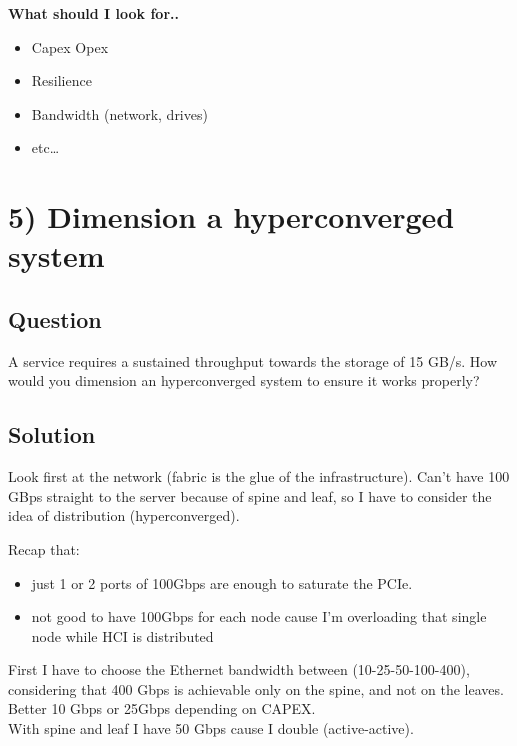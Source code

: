 \textbf{What should I look for..}

\begin{itemize}
\item
  Capex Opex
\item
  Resilience
\item
  Bandwidth (network, drives)
\item
  etc\ldots{}
\end{itemize}

\hypertarget{dimension-a-hyperconverged-system}{%
\section{5) Dimension a hyperconverged
system}\label{dimension-a-hyperconverged-system}}

\hypertarget{question-4}{%
\subsection{Question}\label{question-4}}

A service requires a sustained throughput towards the storage of 15
GB/s. How would you dimension an hyperconverged system to ensure it
works properly?

\hypertarget{solution-4}{%
\subsection{Solution}\label{solution-4}}

Look first at the network (fabric is the glue of the infrastructure).
Can't have 100 GBps straight to the server because of spine and leaf, so
I have to consider the idea of distribution (hyperconverged).

Recap that:

\begin{itemize}
\item
  just 1 or 2 ports of 100Gbps are enough to saturate the PCIe.
\item
  not good to have 100Gbps for each node cause I'm overloading that
  single node while HCI is distributed
\end{itemize}

First I have to choose the Ethernet bandwidth between
(10-25-50-100-400), considering that 400 Gbps is achievable only on the
spine, and not on the leaves.\\
Better 10 Gbps or 25Gbps depending on CAPEX.\\
With spine and leaf I have 50 Gbps cause I double (active-active).


